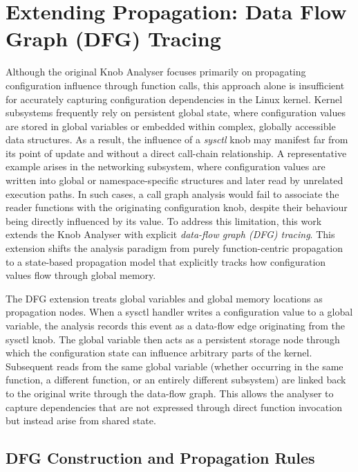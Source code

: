 \section{Extending Propagation: Data Flow Graph (DFG) Tracing}

Although the original Knob Analyser focuses primarily on propagating configuration influence through function calls, this approach alone is insufficient for accurately capturing configuration dependencies in the Linux kernel.
Kernel subsystems frequently rely on persistent global state, where configuration values are stored in global variables or embedded within complex, globally accessible data structures.
As a result, the influence of a \textit{sysctl} knob may manifest far from its point of update and without a direct call-chain relationship.
A representative example arises in the networking subsystem, where configuration values are written into global or namespace-specific structures and later read by unrelated execution paths.
In such cases, a call graph analysis would fail to associate the reader functions with the originating configuration knob, despite their behaviour being directly influenced by its value.
To address this limitation, this work extends the Knob Analyser with explicit \textit{data-flow graph (DFG) tracing}.
This extension shifts the analysis paradigm from purely function-centric propagation to a state-based propagation model that explicitly tracks how configuration values flow through global memory.


The DFG extension treats global variables and global memory locations as propagation nodes.
When a sysctl handler writes a configuration value to a global variable, the analysis records this event as a data-flow edge originating from the sysctl knob.
The global variable then acts as a persistent storage node through which the configuration state can influence arbitrary parts of the kernel.
Subsequent reads from the same global variable (whether occurring in the same function, a different function, or an entirely different subsystem) are linked back to the original write through the data-flow graph.
This allows the analyser to capture dependencies that are not expressed through direct function invocation but instead arise from shared state.

\subsection{DFG Construction and Propagation Rules}

